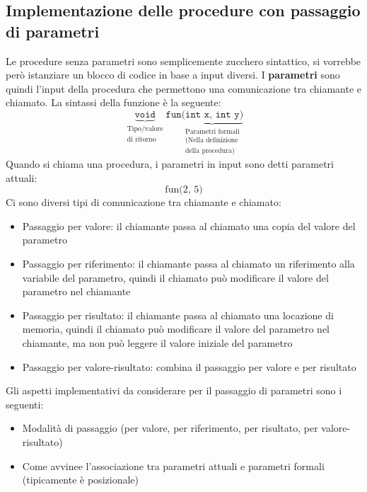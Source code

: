 \documentclass[a4paper]{article}
\begin{document}
\subsection{Implementazione delle procedure con passaggio di parametri}
Le procedure senza parametri sono semplicemente zucchero sintattico, si vorrebbe
però istanziare un blocco di codice in base a input diversi. I \textbf{parametri}
sono quindi l'input della procedura che permettono una comunicazione tra chiamante
e chiamato. La sintassi della funzione è la seguente:
\[
  \underbrace{\texttt{void}}_{
    \substack{
      \text{Tipo/valore}
      \\
      \text{di ritorno}
    }
  }
  \texttt{fun} 
  \underbrace{\texttt{(int x, int y)}}_{
    \substack{
      \text{Parametri formali}\\
      \text{(Nella definizione}\\
      \text{della procedura)}
    }
  }
\] 
Quando si chiama una procedura, i parametri in input sono detti parametri attuali:
\[
  \text{fun(2, 5)}
\] 
Ci sono diversi tipi di comunicazione tra chiamante e chiamato:
\begin{itemize}
  \item Passaggio per valore: il chiamante passa al chiamato una copia del valore del
    parametro

  \item Passaggio per riferimento: il chiamante passa al chiamato un riferimento alla
    variabile del parametro, quindi il chiamato può modificare il valore del
    parametro nel chiamante

  \item Passaggio per risultato: il chiamante passa al chiamato una locazione di
    memoria, quindi il chiamato può modificare il valore del parametro nel
    chiamante, ma non può leggere il valore iniziale del parametro

  \item Passaggio per valore-risultato: combina il passaggio per valore e per risultato
\end{itemize}

\vspace{1em}
\noindent
Gli aspetti implementativi da considerare per il passaggio di parametri sono i seguenti:
\begin{itemize}
  \item Modalità di passaggio (per valore, per riferimento, per risultato, per
    valore-risultato)

  \item Come avvinee l'associazione tra parametri attuali e parametri formali 
    (tipicamente è posizionale)
\end{itemize}
\end{document}
